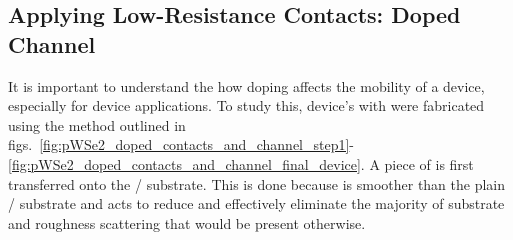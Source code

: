 \subsection{Applying Low-Resistance Contacts: Doped Channel}\label{subsec:mufe_doped_channel}
It is important to understand the how doping affects the mobility of a device, especially for device applications. To study this, device's with were fabricated using the method outlined in figs.~\ref{fig:pWSe2_doped_contacts_and_channel_step1}-\ref{fig:pWSe2_doped_contacts_and_channel_final_device}. A piece of \hbn is first transferred onto the / substrate. This is done because \hbn is smoother than the plain / substrate and acts to reduce and effectively eliminate the majority of substrate and roughness scattering that would be present otherwise. 
\begin{figure}
	\centering
	\qquad
	\qquad
\end{figure}
